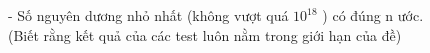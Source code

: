 - Số nguyên dương nhỏ nhất (không vượt quá $10^{18}$   ) có đúng n ước.   
\\   (Biết rằng kết quả của các test luôn nằm trong giới hạn của đề)
